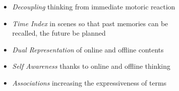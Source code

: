 \begin{itemize}
    \item{\emph{Decoupling} thinking from immediate motoric reaction}
    \item{\emph{Time Index} in scenes so that past memories can be\\
        recalled, the future be planned}
    \item{\emph{Dual Representation} of online and offline contents}
    \item{\emph{Self Awareness} thanks to online and offline thinking}
    \item{\emph{Associations} increasing the expressiveness of terms}
\end{itemize}
